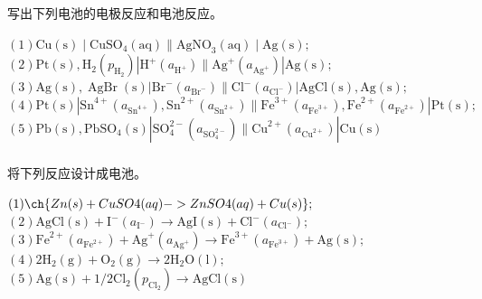 \documentclass[dvipsnames, svgnames, x11names]{beamer}
\begin{document}
	
	\begin{frame}[t]
		\frametitle{}
	
		\begin{example}
			写出下列电池的电极反应和电池反应。
	
	$(1)  \mathrm{Cu}(\mathrm{s}) \mid \mathrm{CuSO}_{4}  (\mathrm{aq})  \| \mathrm{AgNO}_{3} (\mathrm{aq})  \mid \mathrm{Ag}  (\mathrm{s});$ \\
	$(2)  \mathrm{Pt}(\mathrm{s}), \mathrm{H}_{2}(p_{\mathrm{H}_{2}})|\mathrm{H}^{+}(a_{\mathrm{H}^{+}}) \| \mathrm{Ag}^{+}(a_{\mathrm{Ag}^{+}})| \mathrm{Ag}(\mathrm{s}) ;$ \\
	$(3)  \mathrm{Ag}(\mathrm{s}), \operatorname{AgBr}(\mathrm{s})|\mathrm{Br}^{-}(a_{\mathrm{Br}^{-}}) \| \mathrm{Cl}^{-}(a_{\mathrm{Cl}^{-}})| \mathrm{AgCl}(\mathrm{s}), \mathrm{Ag}(\mathrm{s}) ;$ \\
	$(4)  \mathrm{Pt}(\mathrm{s})|\mathrm{Sn}^{4+}(a_{\mathrm{Sn}^{4+}}), \mathrm{Sn}^{2+}(a_{\mathrm{Sn}^{2+}}) \| \mathrm{Fe}^{3+}(a_{\mathrm{Fe}^{3+}}), \mathrm{Fe}^{2+}(a_{\mathrm{Fe}^{2+}})| \mathrm{Pt}(\mathrm{s}) ;$ \\
	$(5)  \mathrm{Pb}(\mathrm{s}), \mathrm{PbSO}_{4}(\mathrm{s})|\mathrm{SO}_{4}^{2-}(a_{\mathrm{SO}_{4}^{2-}}) \| \mathrm{Cu}^{2+}(a_{\mathrm{Cu}^{2+}})| \mathrm{Cu}(\mathrm{s})$ 
	
		\end{example}
	
	\end{frame}
	
	
	\begin{frame}[t]
		\frametitle{}
	
		\begin{example}
			将下列反应设计成电池。
		
	$(1)  \ch{Zn (s) + CuSO4 (aq) -> ZnSO4 (aq) + Cu (s)};$ \\
	$(2)  \mathrm{AgCl}(\mathrm{s})+\mathrm{I}^{-}(a_{\mathrm{I}^{-}}) \longrightarrow \mathrm{AgI}(\mathrm{s})+\mathrm{Cl}^{-}(a_{\mathrm{Cl}^{-}}) ;$ \\
	$(3)  \mathrm{Fe}^{2+}(a_{\mathrm{Fe}^{2+}})+\mathrm{Ag}^{+}(a_{\mathrm{Ag}^{+}}) \longrightarrow \mathrm{Fe}^{3+}(a_{\mathrm{Fe}^{3+}})+\mathrm{Ag}(\mathrm{s}) ;$ \\
	$(4)  2 \mathrm{H}_{2}(\mathrm{g})+\mathrm{O}_{2}(\mathrm{g}) \longrightarrow 2 \mathrm{H}_{2} \mathrm{O}(\mathrm{l}) ;$ \\
	$(5)  \mathrm{Ag}(\mathrm{s})+ 1/2 \mathrm{Cl}_{2}(p_{\mathrm{Cl}_{2}}) \longrightarrow \mathrm{AgCl}(\mathrm{s}) $
	
		\end{example}
	
	\end{frame}
\end{document}
